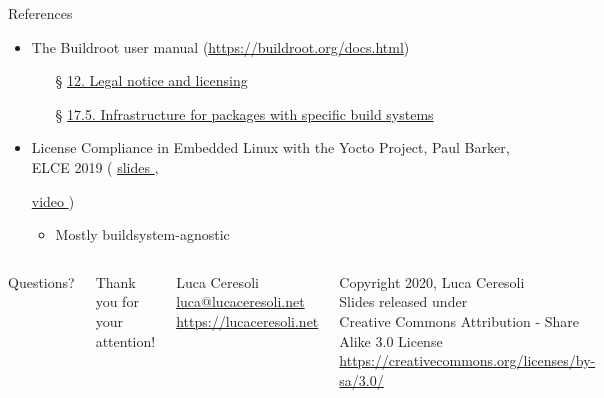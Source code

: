 \documentclass[xetex,table,table]{beamer}
\newcommand{\myhref}[2]{
  \href{#1}{#2 {\tiny\faExternalLink{}}}
}
\begin{document}
\begin{frame}{References}
  \begin{itemize}
  \item The Buildroot user manual ({\small\url{https://buildroot.org/docs.html}})
    \begin{itemize}
    \item[\S] \myhref{https://buildroot.org/downloads/manual/manual.html\#legal-info}
                     {12. Legal notice and licensing}
    \item[\S] \myhref{https://buildroot.org/downloads/manual/manual.html\#_infrastructure_for_packages_with_specific_build_systems}
                     {17.5. Infrastructure for packages with specific build systems}
    \end{itemize}
  \item License Compliance in Embedded Linux with the Yocto Project, Paul
    Barker, ELCE 2019
    (\myhref{https://elinux.org/images/2/20/License_Compliance_in_Embedded_Linux_with_the_Yocto_Project.pdf}{slides},
    \myhref{https://youtu.be/9wRn-9KhiEI?list=PLbzoR-pLrL6pamOj4UifcMJf560Ph6mJp}{video})
    \begin{itemize}
    \item Mostly buildsystem-agnostic
    \end{itemize}
  \end{itemize}
\end{frame}

\begin{frame}
  \begin{columns}
    \center

    {\Huge Questions?}

    \center

    {\Large Thank you for your attention!}

    \vspace{0.15\textheight}

    {\Large Luca Ceresoli}\\
    \href{mailto:luca@lucaceresoli.net}{luca@lucaceresoli.net}\\
    \url{https://lucaceresoli.net}

    \vspace{0.05\textheight}

    \tiny
    \textcopyright{} Copyright 2020, Luca Ceresoli\\
    Slides released under\\
    Creative Commons Attribution - Share Alike 3.0 License \\
    \url{https://creativecommons.org/licenses/by-sa/3.0/} \\
\end{columns}
\end{frame}
\end{document}
